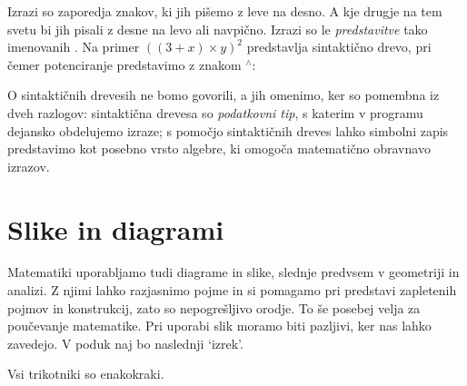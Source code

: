 Izrazi so zaporedja znakov, ki jih pišemo z leve na desno. A kje drugje na tem svetu bi jih pisali z desne na levo ali
navpično. Izrazi so le \emph{predstavitve} tako imenovanih . Na primer $((3 + x) \times y)^2$ predstavlja sintaktično drevo, pri čemer potenciranje predstavimo z znakom ${}^{\wedge}$:
%
\begin{center}
\end{center}
%
O sintaktičnih drevesih ne bomo govorili, a jih omenimo, ker so pomembna iz dveh razlogov: sintaktična drevesa so
\emph{podatkovni tip}, s katerim v programu dejansko obdelujemo izraze; s pomočjo sintaktičnih dreves lahko simbolni zapis predstavimo kot posebno vrsto algebre, ki omogoča matematično obravnavo izrazov.


\section{Slike in diagrami}
\label{sec:slike-in-diagrami}

Matematiki uporabljamo tudi diagrame in slike, slednje predvsem v geometriji in analizi. Z
njimi lahko razjasnimo pojme in si pomagamo pri predstavi zapletenih pojmov in
konstrukcij, zato so nepogrešljivo orodje. To še posebej velja za poučevanje matematike.
%
Pri uporabi slik moramo biti pazljivi, ker nas lahko zavedejo. V poduk naj bo naslednji `izrek'.

\begin{izrek}[neveljaven]
  Vsi trikotniki so enakokraki.
\end{izrek}

